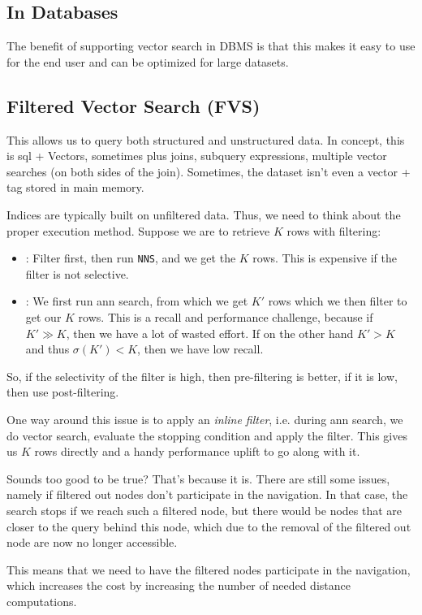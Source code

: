 \subsection{In Databases}
The benefit of supporting vector search in DBMS is that this makes it easy to use for the end user and can be optimized for large datasets.

\subsection{Filtered Vector Search (FVS)}
This allows us to query both structured and unstructured data. In concept, this is \acrshort{sql} + Vectors, sometimes plus joins, subquery expressions,
multiple vector searches (on both sides of the join). Sometimes, the dataset isn't even a vector + tag stored in main memory.

Indices are typically built on unfiltered data. Thus, we need to think about the proper execution method. Suppose we are to retrieve $K$ rows with filtering:
\begin{itemize}
    \item {}: Filter first, then run \texttt{NNS}, and we get the $K$ rows. This is expensive if the filter is not selective.
    \item {}: We first run \acrshort{ann} search, from which we get $K'$ rows which we then filter to get our $K$ rows.
          This is a recall and performance challenge, because if $K' \gg K$, then we have a lot of wasted effort.
          If on the other hand $K' > K$ and thus $\sigma(K') < K$, then we have low recall.
\end{itemize}
So, if the selectivity of the filter is high, then pre-filtering is better, if it is low, then use post-filtering.

One way around this issue is to apply an \textit{inline filter}, i.e. during \acrshort{ann} search, we do vector search, evaluate the stopping condition and apply the filter.
This gives us $K$ rows directly and a handy performance uplift to go along with it.

Sounds too good to be true? That's because it is. There are still some issues, namely if filtered out nodes don't participate in the navigation.
In that case, the search stops if we reach such a filtered node, but there would be nodes that are closer to the query behind this node,
which due to the removal of the filtered out node are now no longer accessible.

This means that we need to have the filtered nodes participate in the navigation, which increases the cost by increasing the number of needed distance computations.

